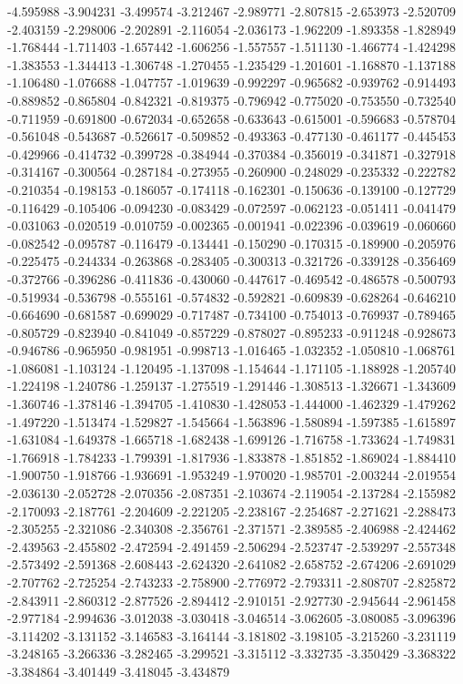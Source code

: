 -4.595988
-3.904231
-3.499574
-3.212467
-2.989771
-2.807815
-2.653973
-2.520709
-2.403159
-2.298006
-2.202891
-2.116054
-2.036173
-1.962209
-1.893358
-1.828949
-1.768444
-1.711403
-1.657442
-1.606256
-1.557557
-1.511130
-1.466774
-1.424298
-1.383553
-1.344413
-1.306748
-1.270455
-1.235429
-1.201601
-1.168870
-1.137188
-1.106480
-1.076688
-1.047757
-1.019639
-0.992297
-0.965682
-0.939762
-0.914493
-0.889852
-0.865804
-0.842321
-0.819375
-0.796942
-0.775020
-0.753550
-0.732540
-0.711959
-0.691800
-0.672034
-0.652658
-0.633643
-0.615001
-0.596683
-0.578704
-0.561048
-0.543687
-0.526617
-0.509852
-0.493363
-0.477130
-0.461177
-0.445453
-0.429966
-0.414732
-0.399728
-0.384944
-0.370384
-0.356019
-0.341871
-0.327918
-0.314167
-0.300564
-0.287184
-0.273955
-0.260900
-0.248029
-0.235332
-0.222782
-0.210354
-0.198153
-0.186057
-0.174118
-0.162301
-0.150636
-0.139100
-0.127729
-0.116429
-0.105406
-0.094230
-0.083429
-0.072597
-0.062123
-0.051411
-0.041479
-0.031063
-0.020519
-0.010759
-0.002365
-0.001941
-0.022396
-0.039619
-0.060660
-0.082542
-0.095787
-0.116479
-0.134441
-0.150290
-0.170315
-0.189900
-0.205976
-0.225475
-0.244334
-0.263868
-0.283405
-0.300313
-0.321726
-0.339128
-0.356469
-0.372766
-0.396286
-0.411836
-0.430060
-0.447617
-0.469542
-0.486578
-0.500793
-0.519934
-0.536798
-0.555161
-0.574832
-0.592821
-0.609839
-0.628264
-0.646210
-0.664690
-0.681587
-0.699029
-0.717487
-0.734100
-0.754013
-0.769937
-0.789465
-0.805729
-0.823940
-0.841049
-0.857229
-0.878027
-0.895233
-0.911248
-0.928673
-0.946786
-0.965950
-0.981951
-0.998713
-1.016465
-1.032352
-1.050810
-1.068761
-1.086081
-1.103124
-1.120495
-1.137098
-1.154644
-1.171105
-1.188928
-1.205740
-1.224198
-1.240786
-1.259137
-1.275519
-1.291446
-1.308513
-1.326671
-1.343609
-1.360746
-1.378146
-1.394705
-1.410830
-1.428053
-1.444000
-1.462329
-1.479262
-1.497220
-1.513474
-1.529827
-1.545664
-1.563896
-1.580894
-1.597385
-1.615897
-1.631084
-1.649378
-1.665718
-1.682438
-1.699126
-1.716758
-1.733624
-1.749831
-1.766918
-1.784233
-1.799391
-1.817936
-1.833878
-1.851852
-1.869024
-1.884410
-1.900750
-1.918766
-1.936691
-1.953249
-1.970020
-1.985701
-2.003244
-2.019554
-2.036130
-2.052728
-2.070356
-2.087351
-2.103674
-2.119054
-2.137284
-2.155982
-2.170093
-2.187761
-2.204609
-2.221205
-2.238167
-2.254687
-2.271621
-2.288473
-2.305255
-2.321086
-2.340308
-2.356761
-2.371571
-2.389585
-2.406988
-2.424462
-2.439563
-2.455802
-2.472594
-2.491459
-2.506294
-2.523747
-2.539297
-2.557348
-2.573492
-2.591368
-2.608443
-2.624320
-2.641082
-2.658752
-2.674206
-2.691029
-2.707762
-2.725254
-2.743233
-2.758900
-2.776972
-2.793311
-2.808707
-2.825872
-2.843911
-2.860312
-2.877526
-2.894412
-2.910151
-2.927730
-2.945644
-2.961458
-2.977184
-2.994636
-3.012038
-3.030418
-3.046514
-3.062605
-3.080085
-3.096396
-3.114202
-3.131152
-3.146583
-3.164144
-3.181802
-3.198105
-3.215260
-3.231119
-3.248165
-3.266336
-3.282465
-3.299521
-3.315112
-3.332735
-3.350429
-3.368322
-3.384864
-3.401449
-3.418045
-3.434879
